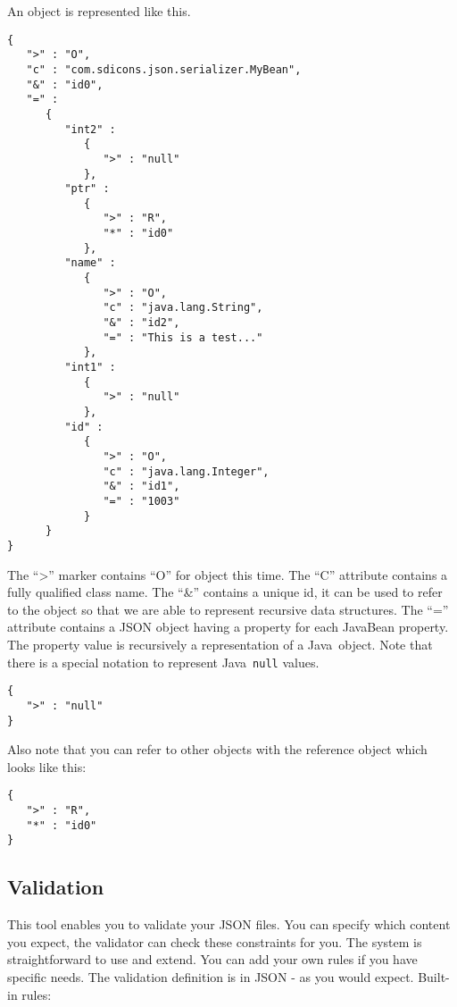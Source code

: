 \documentclass[a4paper]{article}
\newcommand{\java}{Java}
\begin{document}
An object is represented like this.

\medskip
\begin{lstlisting}
{
   ">" : "O",
   "c" : "com.sdicons.json.serializer.MyBean",
   "&" : "id0",
   "=" :
      {
         "int2" :
            {
               ">" : "null"
            },
         "ptr" :
            {
               ">" : "R",
               "*" : "id0"
            },
         "name" :
            {
               ">" : "O",
               "c" : "java.lang.String",
               "&" : "id2",
               "=" : "This is a test..."
            },
         "int1" :
            {
               ">" : "null"
            },
         "id" :
            {
               ">" : "O",
               "c" : "java.lang.Integer",
               "&" : "id1",
               "=" : "1003"
            }
      }
}
\end{lstlisting}
\medskip

The ``>'' marker contains ``O'' for object this time. The ``C'' attribute contains a fully qualified class name. The ``\&'' contains a unique id, it can be used to refer to the object so that we are able to represent recursive data structures. The ``=''  attribute contains a JSON object having a property for each JavaBean property.  The property value is recursively a representation of a \java\ object. Note that there is a special notation to represent \java\ \lstinline{null} values.

\medskip
\begin{lstlisting}
{
   ">" : "null"
}
\end{lstlisting}
\medskip

Also note that you can refer to other objects with the reference object which looks like this:

\medskip
\begin{lstlisting}
{
   ">" : "R",
   "*" : "id0"
}
\end{lstlisting}
\medskip
 
\subsection{Validation}

This tool enables you to validate your JSON files. You can specify which content you expect, the validator can check these constraints for you. The system is straightforward to use and extend. You can add your own rules if you have specific needs. The validation definition is in JSON - as you would expect. Built-in rules:
\end{document}
